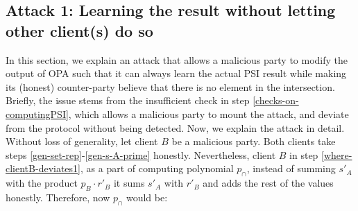 % 
% 
%
%



\subsection{Attack 1: Learning the result without letting other client(s)  do so}  In this section, we explain an attack that allows a malicious party to modify the output of OPA such that it can always learn the actual PSI result while   making its (honest) counter-party believe that there is no element in the intersection.  Briefly, the issue stems from  the insufficient check in step \ref{checks-on-computingPSI}, which allows a  malicious party to mount the attack, and deviate from the protocol without being detected. Now, we explain the attack in detail. Without loss of generality, let client $B$ be a malicious party. Both clients take  steps \ref{gen-set-rep}-\ref{gen-s-A-prime} honestly. Nevertheless, client $B$ in step  \ref{where-clientB-deviates1}, as a part of   computing  polynomial $p_{\scriptscriptstyle \cap}$,  instead of summing $s'_{\scriptscriptstyle A}$ with  the product  $p_{\scriptscriptstyle B}\cdot r'_{\scriptscriptstyle B}$ it sums  $s'_{\scriptscriptstyle A}$ with $r'_{\scriptscriptstyle B}$ and adds the rest of the values honestly. Therefore, now   $p_{\scriptscriptstyle \cap} $ would be: 



